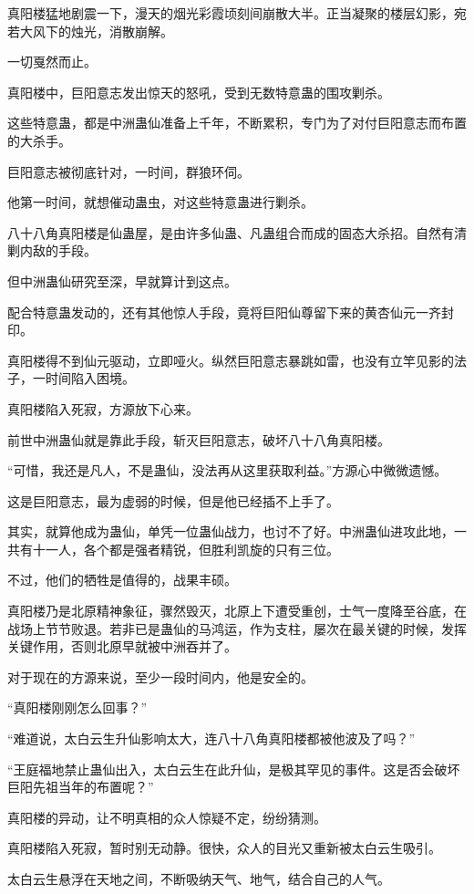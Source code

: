 \begin{this_body}
真阳楼猛地剧震一下，漫天的烟光彩霞顷刻间崩散大半。正当凝聚的楼层幻影，宛若大风下的烛光，消散崩解。

一切戛然而止。

真阳楼中，巨阳意志发出惊天的怒吼，受到无数特意蛊的围攻剿杀。

这些特意蛊，都是中洲蛊仙准备上千年，不断累积，专门为了对付巨阳意志而布置的大杀手。

巨阳意志被彻底针对，一时间，群狼环伺。

他第一时间，就想催动蛊虫，对这些特意蛊进行剿杀。

八十八角真阳楼是仙蛊屋，是由许多仙蛊、凡蛊组合而成的固态大杀招。自然有清剿内敌的手段。

但中洲蛊仙研究至深，早就算计到这点。

配合特意蛊发动的，还有其他惊人手段，竟将巨阳仙尊留下来的黄杏仙元一齐封印。

真阳楼得不到仙元驱动，立即哑火。纵然巨阳意志暴跳如雷，也没有立竿见影的法子，一时间陷入困境。

真阳楼陷入死寂，方源放下心来。

前世中洲蛊仙就是靠此手段，斩灭巨阳意志，破坏八十八角真阳楼。

“可惜，我还是凡人，不是蛊仙，没法再从这里获取利益。”方源心中微微遗憾。

这是巨阳意志，最为虚弱的时候，但是他已经插不上手了。

其实，就算他成为蛊仙，单凭一位蛊仙战力，也讨不了好。中洲蛊仙进攻此地，一共有十一人，各个都是强者精锐，但胜利凯旋的只有三位。

不过，他们的牺牲是值得的，战果丰硕。

真阳楼乃是北原精神象征，骤然毁灭，北原上下遭受重创，士气一度降至谷底，在战场上节节败退。若非已是蛊仙的马鸿运，作为支柱，屡次在最关键的时候，发挥关键作用，否则北原早就被中洲吞并了。

对于现在的方源来说，至少一段时间内，他是安全的。

“真阳楼刚刚怎么回事？”

“难道说，太白云生升仙影响太大，连八十八角真阳楼都被他波及了吗？”

“王庭福地禁止蛊仙出入，太白云生在此升仙，是极其罕见的事件。这是否会破坏巨阳先祖当年的布置呢？”

真阳楼的异动，让不明真相的众人惊疑不定，纷纷猜测。

真阳楼陷入死寂，暂时别无动静。很快，众人的目光又重新被太白云生吸引。

太白云生悬浮在天地之间，不断吸纳天气、地气，结合自己的人气。


\end{this_body}
